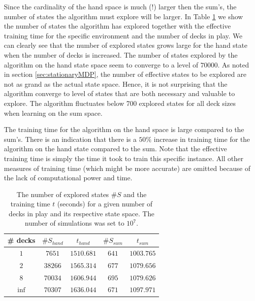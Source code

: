 Since the cardinality of the hand space is much (!) larger then the sum's, the number of states the algorithm must explore will be larger. In Table \ref{tab:state_visited} we show the number of states the algorithm has explored together with the effective training time for the specific environment and the number of decks in play. We can clearly see that the number of explored states grows large for the hand state when the number of decks is increased. The number of states explored by the algorithm on the hand state space seem to converge to a level of $70 000$. As noted in section \ref{sec:stationaryMDP}, the number of effective states to be explored are not as grand as the actual state space. Hence, it is not surprising that the algorithm converge to level of states that are both necessary and valuable to explore. The algorithm fluctuates below 700 explored states for all deck sizes when learning on the sum space.

The training time for the algorithm on the hand space is large compared to the sum's. There is an indication that there is a $50\%$ increase in training time for the algorithm on the hand state compared to the sum. Note that the effective training time is simply the time it took to train this specific instance. All other measures of training time (which might be more accurate) are omitted because of the lack of computational power and time. 
\begin{table}[h!]
\centering
 \begin{tabular}{c|cc|cc}
  \# decks & $\#S_{hand}$ & $t_{hand}$ & $\#S_{sum}$ &  $t_{sum}$  \\
  \hline 
  $1$ & $7651$ & $1510.681$ & $641$ & $1003.765$ \\
  $2$ & $38266$ & $1565.314$ & $677$ & $1079.656$ \\
  $8$ & $70034$ & $1606.944$ & $695$ & $1079.626$ \\
  $\inf$ & $70307$ & $1636.044$ & $671$ & $1097.971$ 
 \end{tabular} 
 \caption{The number of explored states $\#S$ and the training time $t$ (seconds) for a given number of decks in play and its respective state space. The number of simulations was set to $10^7$.\label{tab:state_visited}}
\end{table}

